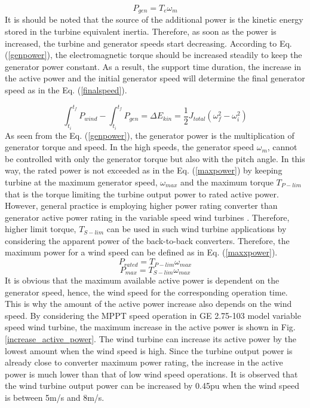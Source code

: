 \begin{equation}
P_{gen}=T_{e} \omega_{m}
\label{genpower}
\end{equation}
It is should be noted that the source of the additional power is the kinetic energy stored in the turbine equivalent inertia. Therefore, as soon as the power is increased, the turbine and generator speeds start decreasing. According to Eq. (\ref{genpower}), the electromagnetic torque should be increased steadily to keep the generator power constant. As a result, the support time duration, the increase in the active power and the initial generator speed will determine the final generator speed as in the Eq. (\ref{finalspeed}).\par
\begin{equation}
 \int_{t_{i}}^{t_{f}}P_{wind}- \int_{t_{i}}^{t_{f}}P_{gen}=\Delta E_{kin}=\frac{1}{2}J_{total}(\omega_{f}^2-\omega_{i}^2)
\label{finalspeed}
\end{equation}
As seen from the Eq. (\ref{genpower}), the generator power is the multiplication of generator torque and speed. In the high speeds, the generator speed $\omega_{m}$, cannot be controlled with only the generator torque but also with the pitch angle. In this way, the rated power is not exceeded as in the Eq. (\ref{maxpower}) by keeping turbine at the maximum generator speed, $\omega_{max}$ and the maximum torque $T_{P-lim}$ that is the torque limiting the turbine output power to rated active power. However, general practice is employing higher power rating converter than generator active power rating in the variable speed wind turbines \cite{Muljadi2012}.  Therefore, higher limit torque, $T_{S-lim}$ can be used in such wind turbine applications by considering the apparent power of the back-to-back converters. Therefore, the maximum power for a wind speed can be defined as in Eq. (\ref{maxxpower}).
\begin{equation}
P_{rated}=T_{P-lim} \omega_{max}
\label{maxpower}
\end{equation}
\begin{equation}
P_{max}=T_{S-lim} \omega_{max}
\label{maxxpower}
\end{equation}
It is obvious that the maximum available active power is dependent on the generator speed, hence, the wind speed for the corresponding operation time. This is why the amount of the active power increase also depends on the wind speed. By considering the MPPT speed operation in GE 2.75-103 model variable speed wind turbine, the maximum increase in the active power is shown in Fig. \ref{increase_active_power}. The wind turbine can increase its active power by the lowest amount when the wind speed is high. Since the turbine output power is already close to converter maximum power rating, the increase in the active power is much lower than that of low wind speed operations. It is observed that the wind turbine output power can be increased by 0.45pu when the wind speed is between 5m/s and 8m/s. \par
